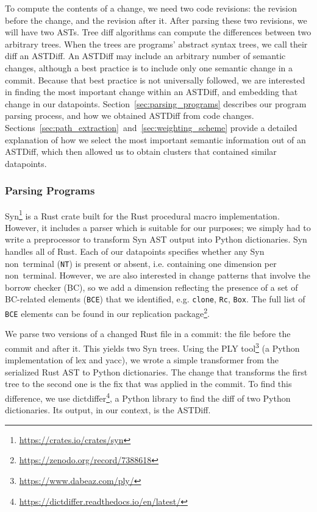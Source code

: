 To compute the contents of a change, we need two code revisions: the revision before the change, and the revision after it. After parsing these two revisions, we will have two ASTs. Tree diff algorithms can compute the differences between two arbitrary trees. When the trees are programs' abstract syntax trees, we call their diff an ASTDiff. An ASTDiff may include an arbitrary number of semantic changes, although a best practice is to include only one semantic change in a commit. Because that best practice is not universally followed, we are interested in finding the most important change within an ASTDiff, and embedding that change in our datapoints. Section~\ref{sec:parsing_programs} describes our program parsing process, and how we obtained ASTDiff from code changes. Sections~\ref{sec:path_extraction}~and~\ref{sec:weighting_scheme} provide a detailed explanation of how we select the most important semantic information out of an ASTDiff, which then allowed us to obtain clusters that contained similar datapoints. 

\subsubsection{\label{sec:parsing_programs}Parsing Programs}

Syn\footnote{\url{https://crates.io/crates/syn}} is a Rust crate built for the Rust procedural macro implementation. However, it includes a parser which is suitable for our purposes; we simply had to write a preprocessor to transform Syn AST output into Python dictionaries. Syn handles all of Rust. Each of our datapoints specifies whether any Syn non~terminal (\texttt{NT}) is present or absent, i.e. containing one dimension per non~terminal. However, we are also interested in change patterns that involve the borrow checker (BC), so we add a dimension reflecting the presence of a set of BC-related elements (\texttt{BCE}) that we identified, e.g. \texttt{clone}, \texttt{Rc}, \texttt{Box}. The full list of \texttt{BCE} elements can be found in our replication package\footnote{\url{https://zenodo.org/record/7388618}}.

We parse two versions of a changed Rust file in a commit: the file before the commit and after it. This yields two Syn trees. Using the PLY tool\footnote{\url{https://www.dabeaz.com/ply/}} (a Python implementation of lex and yacc), we wrote a simple transformer from the serialized Rust AST to Python dictionaries. The change that transforms the first tree to the second one is the fix that was applied in the commit. To find this difference, we use dictdiffer\footnote{\url{https://dictdiffer.readthedocs.io/en/latest/}}, a Python library to find the diff of two Python dictionaries. Its output, in our context, is the ASTDiff.


